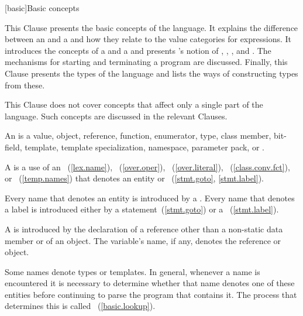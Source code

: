 [basic]{Basic concepts}


\pnum
\enternote This Clause presents the basic concepts of the \Cpp language.
It explains the difference between an  and a
 and how they relate to the value categories for expressions.
It introduces the concepts of a
 and a  and presents \Cpp's
notion of , , , and
 . The mechanisms for starting and
terminating a program are discussed. Finally, this Clause presents the
 types of the language and lists the ways of constructing
 types from these.\exitnote

\pnum
\enternote This Clause does not cover concepts that affect only a single
part of the language. Such concepts are discussed in the relevant
Clauses. \exitnote

\pnum
{}%
%
%
%
%
%
%
%
%
An  is a value, object, reference, function, enumerator, type,
class member, bit-field, template, template specialization, namespace, parameter
pack, or .

\pnum
A  is a use of an ~(\ref{lex.name}),
~(\ref{over.oper}),
~(\ref{over.literal}),
~(\ref{class.conv.fct}), or
~(\ref{temp.names}) that denotes an entity or
~(\ref{stmt.goto}, \ref{stmt.label}).

\pnum
Every name that denotes an entity is introduced by a
. Every name that denotes a label is introduced
either by a  statement~(\ref{stmt.goto}) or a
~(\ref{stmt.label}).

\pnum
A  is introduced by the
declaration of
a reference other than a non-static data member or of
an object. The variable's name, if any, denotes the reference or object.

\pnum
Some names denote types or templates. In general,
whenever a name is encountered it is necessary to determine whether that name denotes
one of these entities before continuing to parse the program that contains it. The
process that determines this is called
%
~(\ref{basic.lookup}).

